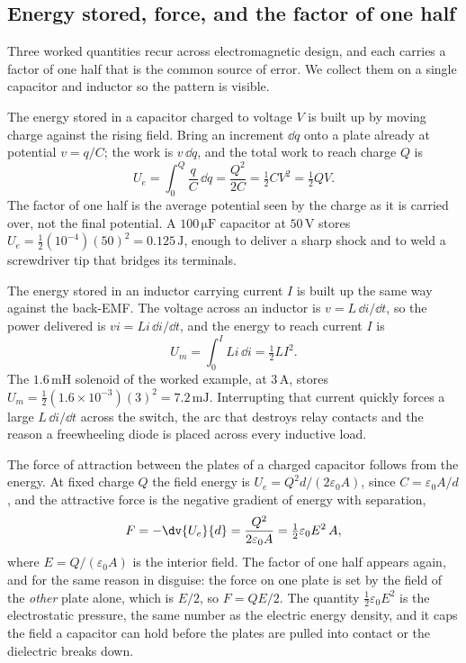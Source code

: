 \subsection{Energy stored, force, and the factor of one half}

Three worked quantities recur across electromagnetic design, and each
carries a factor of one half that is the common source of error. We
collect them on a single capacitor and inductor so the pattern is
visible.

The energy stored in a capacitor charged to voltage $V$ is built up by
moving charge against the rising field. Bring an increment $\dd q$ onto
a plate already at potential $v = q/C$; the work is $v\,\dd q$, and the
total work to reach charge $Q$ is
\[
U_e = \int_{0}^{Q} \frac{q}{C}\,\dd q = \frac{Q^{2}}{2C} =
\tfrac{1}{2}CV^{2} = \tfrac{1}{2}QV.
\]
The factor of one half is the average potential seen by the charge as
it is carried over, not the final potential. A $100\,\si{\micro\farad}$
capacitor at $50\,\si{\volt}$ stores $U_e = \tfrac12(10^{-4})(50)^{2} =
0.125\,\si{\joule}$, enough to deliver a sharp shock and to weld a
screwdriver tip that bridges its terminals.

The energy stored in an inductor carrying current $I$ is built up the
same way against the back-EMF. The voltage across an inductor is
$v = L\,\dd i/\dd t$, so the power delivered is $vi = Li\,\dd i/\dd t$,
and the energy to reach current $I$ is
\[
U_m = \int_{0}^{I} Li\,\dd i = \tfrac{1}{2}LI^{2}.
\]
The $1.6\,\si{\milli\henry}$ solenoid of the worked example, at
$3\,\si{\ampere}$, stores $U_m = \tfrac12(1.6\times 10^{-3})(3)^{2} =
7.2\,\si{\milli\joule}$. Interrupting that current quickly forces a
large $L\,\dd i/\dd t$ across the switch, the arc that destroys relay
contacts and the reason a freewheeling diode is placed across every
inductive load.

The force of attraction between the plates of a charged capacitor
follows from the energy. At fixed charge $Q$ the field energy is
$U_e = Q^{2}d/(2\varepsilon_0 A)$, since $C = \varepsilon_0 A/d$, and
the attractive force is the negative gradient of energy with separation,
\[
F = -\dv{U_e}{d} = \frac{Q^{2}}{2\varepsilon_0 A} = \tfrac{1}{2}
\varepsilon_0 E^{2}\,A,
\]
where $E = Q/(\varepsilon_0 A)$ is the interior field. The factor of one
half appears again, and for the same reason in disguise: the force on
one plate is set by the field of the \emph{other} plate alone, which is
$E/2$, so $F = QE/2$. The quantity $\tfrac12\varepsilon_0 E^{2}$ is the
electrostatic pressure, the same number as the electric energy density,
and it caps the field a capacitor can hold before the plates are pulled
into contact or the dielectric breaks down.

